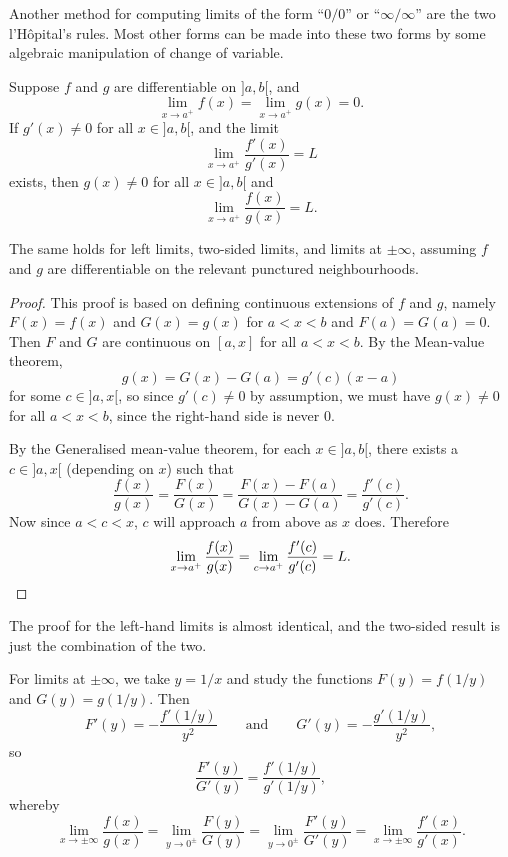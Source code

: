 Another method for computing limits of the form ``$0 / 0$'' or ``$\infty / \infty$'' are the two l'H\^{o}pital's rules. Most other forms can be made into these two forms by some algebraic manipulation of change of variable.

\begin{theorem}
	Suppose $f$ and $g$ are differentiable on ${]{a, b}[}$, and
	\[
		\lim_{x \to a^+} f(x) = \lim_{x \to a^+} g(x) = 0.
	\]
	If $g'(x) \neq 0$ for all $x \in {]{a, b}[}$, and the limit
	\[
		\lim_{x \to a^+} \frac{f'(x)}{g'(x)} = L
	\]
	exists, then $g(x) \neq 0$ for all $x \in {]{a, b}[}$ and
	\[
		\lim_{x \to a^+} \frac{f(x)}{g(x)} = L.
	\]
\end{theorem}

\begin{remark}
	The same holds for left limits, two-sided limits, and limits at $\pm \infty$, assuming $f$ and $g$ are differentiable on the relevant punctured neighbourhoods.
\end{remark}

\begin{proof}
	This proof is based on defining continuous extensions of $f$ and $g$, namely $F(x) = f(x)$ and $G(x) = g(x)$ for $a < x < b$ and $F(a) = G(a) = 0$.
	Then $F$ and $G$ are continuous on $[a, x]$ for all $a < x < b$.
	By the Mean-value theorem,
	\[
		g(x) = G(x) - G(a) = g'(c) (x - a)
	\]
	for some $c \in {]{a, x}[}$, so since $g'(c) \neq 0$ by assumption, we must have $g(x) \neq 0$ for all $a < x < b$, since the right-hand side is never $0$.

	By the Generalised mean-value theorem, for each $x \in {]{a, b}[}$, there exists a $c \in {]{a, x}[}$ (depending on $x$) such that
	\[
		\frac{f(x)}{g(x)} = \frac{F(x)}{G(x)} = \frac{F(x) - F(a)}{G(x) - G(a)} = \frac{f'(c)}{g'(c)}.
	\]
	Now since $a < c < x$, $c$ will approach $a$ from above as $x$ does.
	Therefore
	\[
		\lim_{x \to a^+} \frac{f(x)}{g(x)} = \lim_{c \to a^+} \frac{f'(c)}{g'(c)} = L. \qedhere
	\]
\end{proof}

\noindent
The proof for the left-hand limits is almost identical, and the two-sided result is just the combination of the two.

For limits at $\pm\infty$, we take $y = 1/x$ and study the functions $F(y) = f(1/y)$ and $G(y) = g(1/y)$.
Then
\[
	F'(y) = - \frac{f'(1/y)}{y^2} \qquad \text{and} \qquad G'(y) = - \frac{g'(1 / y)}{y^2},
\]
so
\[
	\frac{F'(y)}{G'(y)} = \frac{f'(1/y)}{g'(1/y)},
\]
whereby
\[
	\lim_{x \to \pm\infty} \frac{f(x)}{g(x)} = \lim_{y \to 0^\pm} \frac{F(y)}{G(y)} = \lim_{y \to 0^\pm} \frac{F'(y)}{G'(y)} = \lim_{x \to \pm\infty} \frac{f'(x)}{g'(x)}.
\]

